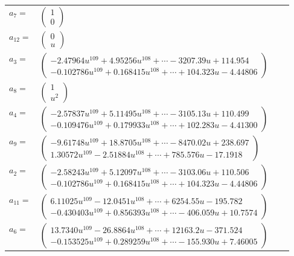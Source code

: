 \documentclass[1p]{elsarticle_modified}
\theoremstyle{definition}
\begin{document}
\begin{tabular}{m{7pt} m{180pt} m{7pt} m{180pt} }
\flushright $a_{7}=$&$\begin{pmatrix}1\\0\end{pmatrix}$ \\
\flushright $a_{12}=$&$\begin{pmatrix}0\\u\end{pmatrix}$ \\
\flushright $a_{3}=$&$\begin{pmatrix}-2.47964 u^{109}+4.95256 u^{108}+\cdots-3207.39 u+114.954\\-0.102786 u^{109}+0.168415 u^{108}+\cdots+104.323 u-4.44806\end{pmatrix}$ \\
\flushright $a_{8}=$&$\begin{pmatrix}1\\u^2\end{pmatrix}$ \\
\flushright $a_{4}=$&$\begin{pmatrix}-2.57837 u^{109}+5.11495 u^{108}+\cdots-3105.13 u+110.499\\-0.109476 u^{109}+0.179933 u^{108}+\cdots+102.283 u-4.41300\end{pmatrix}$ \\
\flushright $a_{9}=$&$\begin{pmatrix}-9.61748 u^{109}+18.8705 u^{108}+\cdots-8470.02 u+238.697\\1.30572 u^{109}-2.51884 u^{108}+\cdots+785.576 u-17.1918\end{pmatrix}$ \\
\flushright $a_{2}=$&$\begin{pmatrix}-2.58243 u^{109}+5.12097 u^{108}+\cdots-3103.06 u+110.506\\-0.102786 u^{109}+0.168415 u^{108}+\cdots+104.323 u-4.44806\end{pmatrix}$ \\
\flushright $a_{11}=$&$\begin{pmatrix}6.11025 u^{109}-12.0451 u^{108}+\cdots+6254.55 u-195.782\\-0.430403 u^{109}+0.856393 u^{108}+\cdots-406.059 u+10.7574\end{pmatrix}$ \\
\flushright $a_{6}=$&$\begin{pmatrix}13.7340 u^{109}-26.8864 u^{108}+\cdots+12163.2 u-371.524\\-0.153525 u^{109}+0.289259 u^{108}+\cdots-155.930 u+7.46005\end{pmatrix}$ \\

\end{tabular}
\end{document}
